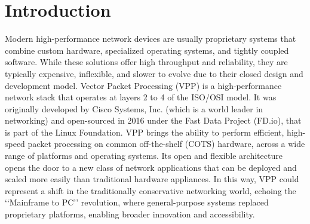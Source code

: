 \chapter*{Introduction}
\setcounter{page}{1}


Modern high-performance network devices are usually proprietary systems that combine custom hardware, specialized operating systems, and tightly coupled software. 
While these solutions offer high throughput and re\-li\-a\-bi\-li\-ty, they are typically expensive, inflexible, and slower to evolve due to their closed design and development model.
Vector Packet Processing (VPP) is a high-performance network stack that operates at layers 2 to 4 of the ISO/OSI model. 
It was originally developed by Cisco Systems, Inc. (which is a world leader in networking) and open-sourced in 2016 under the Fast Data Project (FD.io), that is part of the Linux Foundation.
VPP brings the ability to perform efficient, high-speed packet processing on common off-the-shelf (COTS) hardware, across a wide range of platforms and operating systems.
Its open and flexible architecture opens the door to a new class of network applications that can be deployed and scaled more easily than traditional hardware appliances. 
In this way, VPP could represent a shift in the traditionally conservative networking world, echoing the ‘‘Mainframe to PC’’ revolution, 
where general-purpose systems replaced proprietary platforms, enabling broader innovation and accessibility.

